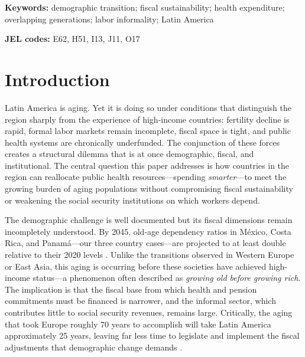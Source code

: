 \documentclass[12pt,a4paper]{article}
\begin{document}
\noindent\textbf{Keywords:} demographic transition; fiscal sustainability; health expenditure; overlapping generations; labor informality; Latin America

\noindent\textbf{JEL codes:} E62, H51, I13, J11, O17

\section{Introduction}
\label{sec:intro}

Latin America is aging. Yet it is doing so under conditions that distinguish the region sharply from the experience of high-income countries: fertility decline is rapid, formal labor markets remain incomplete, fiscal space is tight, and public health systems are chronically underfunded. The conjunction of these forces creates a structural dilemma that is at once demographic, fiscal, and institutional. The central question this paper addresses is how countries in the region can reallocate public health resources---spending \textit{smarter}---to meet the growing burden of aging populations without compromising fiscal sustainability or weakening the social security institutions on which workers depend.

The demographic challenge is well documented but its fiscal dimensions remain incompletely understood. By 2045, old-age dependency ratios in M\'exico, Costa Rica, and Panam\'a---our three country cases---are projected to at least double relative to their 2020 levels \citep{ECLAC2022}. Unlike the transitions observed in Western Europe or East Asia, this aging is occurring before these societies have achieved high-income status---a phenomenon often described as \textit{growing old before growing rich}. The implication is that the fiscal base from which health and pension commitments must be financed is narrower, and the informal sector, which contributes little to social security revenues, remains large. Critically, the aging that took Europe roughly 70 years to accomplish will take Latin America approximately 25 years, leaving far less time to legislate and implement the fiscal adjustments that demographic change demands \citep{WorldBankInformalizing2025}.
\end{document}
